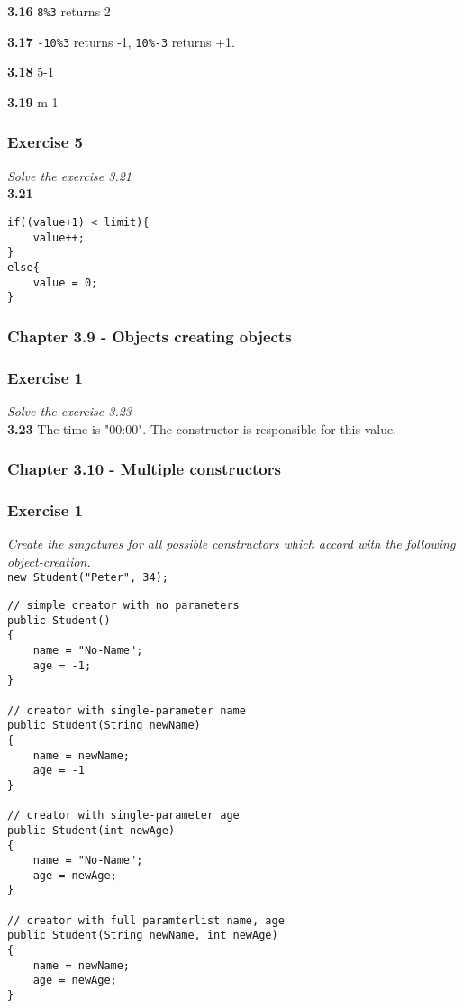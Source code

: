 \textbf{3.16} \lstinline!8%3! returns 2

\textbf{3.17} \lstinline!-10%3! returns -1, \lstinline!10%-3! returns +1.

\textbf{3.18} 5-1

\textbf{3.19} m-1

\subsubsection*{Exercise 5}
\textit{Solve the exercise 3.21}\\

\textbf{3.21} 
\begin{lstlisting}
if((value+1) < limit){
	value++;
}
else{
	value = 0;
}
\end{lstlisting}

\subsubsection{Chapter 3.9 - Objects creating objects}

\subsubsection*{Exercise 1}
\textit{Solve the exercise 3.23}\\

\textbf{3.23} The time is "00:00". The constructor is responsible for this value.

\subsubsection{Chapter 3.10 - Multiple constructors}

\subsubsection*{Exercise 1}
\textit{Create the singatures for all possible constructors which accord
with the following object-creation.}\\
\lstinline{new Student("Peter", 34);}

\begin{lstlisting}
// simple creator with no parameters
public Student()
{
	name = "No-Name";
	age = -1;
}

// creator with single-parameter name
public Student(String newName)
{
	name = newName;
	age = -1
}

// creator with single-parameter age
public Student(int newAge)
{
	name = "No-Name";
	age = newAge;
}

// creator with full paramterlist name, age
public Student(String newName, int newAge)
{
	name = newName;
	age = newAge;
}
\end{lstlisting}

